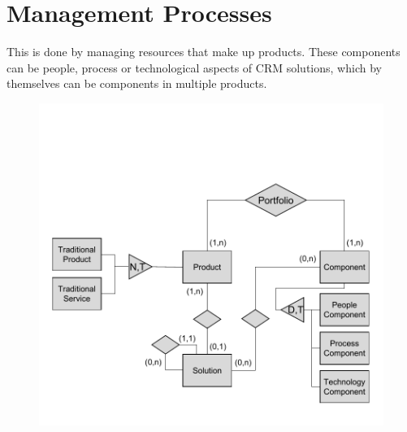 

	

	


	
	
	 
	
	
	
	
\section{Management Processes}
	This is done by managing resources that make up products. These components can be people, process or technological aspects of \acrshort{CRM} solutions, which by themselves can be components in multiple products.
	

\begin{figure}[caption={Solution-Product-Portfolio structure }, label={fig:prodstructure}]
	{	\includegraphics[width=.8\textwidth]{figures/producterm.pdf}}
	
\end{figure} 



